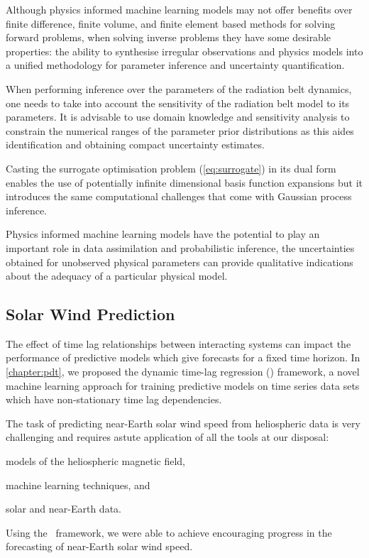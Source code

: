 Although physics informed machine learning models may not offer benefits over 
finite difference, finite volume, and finite element based methods for solving 
forward problems, when solving inverse problems they have some desirable 
properties: the ability to synthesise irregular observations and physics models 
into a unified methodology for parameter inference and uncertainty 
quantification. 

When performing inference over the parameters of the radiation belt dynamics, 
one needs to take into account the sensitivity of the radiation belt model to 
its parameters. It is advisable to use domain knowledge and sensitivity 
analysis to constrain the numerical ranges of the parameter prior distributions 
as this aides identification and obtaining compact uncertainty estimates.

Casting the surrogate optimisation problem (\cref{eq:surrogate}) in its dual 
form enables the use of potentially infinite dimensional basis function 
expansions but it introduces the same computational challenges that come with 
Gaussian process inference. 

Physics informed machine learning models have the potential to 
play an important role in data assimilation and probabilistic inference, the 
uncertainties obtained for unobserved physical parameters can provide 
qualitative indications about the adequacy of a particular physical model. 

\subsection*{Solar Wind Prediction}

The effect of time lag relationships between interacting systems can impact the 
performance of predictive models which give forecasts for a fixed time horizon. 
In \cref{chapter:pdt}, we proposed the dynamic time-lag regression (\XX) 
framework, a novel machine learning approach for training predictive models on 
time series data sets which have non-stationary time lag dependencies.

The task of predicting near-Earth solar wind speed from heliospheric data is 
very challenging and requires astute application of all the tools at our 
disposal: 
\begin{enumerate*} 
    \item models of the heliospheric magnetic field,
    \item machine learning techniques, and 
    \item solar and near-Earth data. 
\end{enumerate*}
Using the \XX \ framework, we were able to achieve encouraging progress in the 
forecasting of near-Earth solar wind speed.
 

